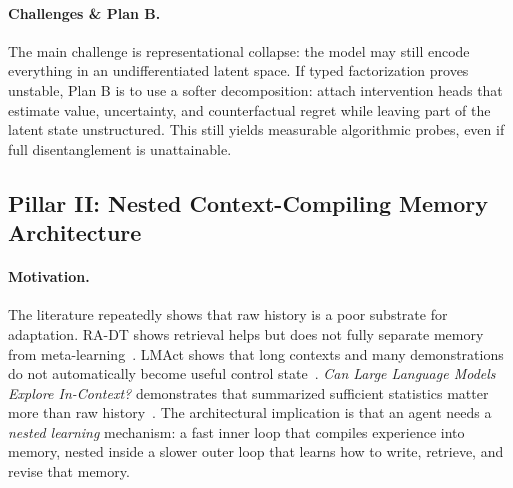 \documentclass[10pt,twocolumn,letterpaper]{article}
\begin{document}
\paragraph{Challenges \& Plan B.}
The main challenge is representational collapse: the model may still encode everything in an undifferentiated latent space. If typed factorization proves unstable, Plan B is to use a softer decomposition: attach intervention heads that estimate value, uncertainty, and counterfactual regret while leaving part of the latent state unstructured. This still yields measurable algorithmic probes, even if full disentanglement is unattainable.

\subsection{Pillar II: Nested Context-Compiling Memory Architecture}
\paragraph{Motivation.}
The literature repeatedly shows that raw history is a poor substrate for adaptation. RA-DT shows retrieval helps but does not fully separate memory from meta-learning~\cite{schmied2024radt}. LMAct shows that long contexts and many demonstrations do not automatically become useful control state~\cite{ruoss2024lmact}. \emph{Can Large Language Models Explore In-Context?} demonstrates that summarized sufficient statistics matter more than raw history~\cite{krishnamurthy2024explore}. The architectural implication is that an agent needs a \emph{nested learning} mechanism: a fast inner loop that compiles experience into memory, nested inside a slower outer loop that learns how to write, retrieve, and revise that memory.
\end{document}

